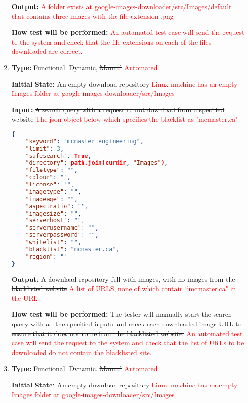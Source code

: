 \documentclass[12pt, titlepage]{article}
\begin{document}
\begin{enumerate}[label=FR-SQ\arabic*:, wide=0pt, leftmargin=*]
\textbf{Output:} \textcolor{red}{A folder exists at google-images-downloader/src/Images/default that contains
three images with the file extension .png}
					
\textbf{How test will be performed:} \textcolor{red}{An automated test case will send the request 
to the system and check that the file extensions on each of the files downloaded are correct.}

\item \phantom{empty}

\textbf{Type:} Functional, Dynamic, \sout{Manual} \textcolor{red}{Automated}
					
\textbf{Initial State:} \sout{An empty download repository}
\textcolor{red}{Linux machine has an empty Images folder at google-images-downloader/src/Images}
					
\textbf{Input:} \sout{A search query with a request to not download from a specified website}
\textcolor{red}{The json object below which specifies the blacklist as "mcmaster.ca"}
\begin{lstlisting}[language=json,firstnumber=1]
{
	"keyword": "mcmaster engineering",
	"limit": 3,
	"safesearch": True,
	"directory": path.join(curdir, "Images"),
	"filetype": "",
	"colour": "",
	"license": "",
	"imagetype": "",
	"imageage": "",
	"aspectratio": "",
	"imagesize": "",
	"serverhost": "",
	"serverusername": "",
	"serverpassword": "",
	"whitelist": "",
	"blacklist": "mcmaster.ca",
	"region": ""
}
\end{lstlisting}
					
\textbf{Output:} \sout{A download repository full with images, with no images from the blacklisted website}
\textcolor{red}{A list of URLS, none of which contain ``mcmaster.ca" in the URL}
					
\textbf{How test will be performed:} \sout{The tester will manually start the search query with all 
the specified inputs and check each downloaded image URL to ensure that it does not come from 
the blacklisted website.}
\textcolor{red}{An automated test case will send the request to the system and check that the list 
of URLs to be downloaded do not contain the blacklisted site.}

\item \phantom{empty}

\textbf{Type:} Functional, Dynamic, \sout{Manual} \textcolor{red}{Automated}
					
\textbf{Initial State:} \sout{An empty download repository}
\textcolor{red}{Linux machine has an empty Images folder at google-images-downloader/src/Images}
					

\end{enumerate}
\end{document}
